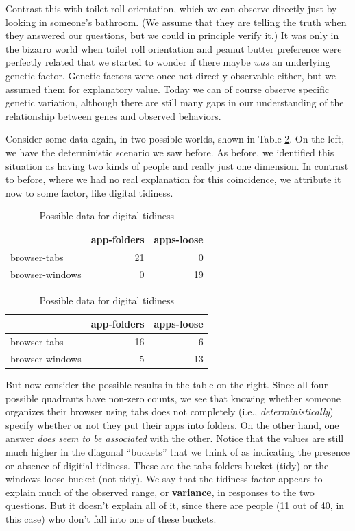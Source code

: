 \documentclass[openany]{book}
\begin{document}
Contrast this with toilet roll orientation, which we can observe directly just by looking in someone's bathroom. (We assume that they are telling the truth when they answered our questions, but we could in principle verify it.) It was only in the bizarro world when toilet roll orientation and peanut butter preference were perfectly related that we started to wonder if there maybe \emph{was} an underlying genetic factor. Genetic factors were once not directly observable either, but we assumed them for explanatory value. Today we can of course observe specific genetic variation, although there are still many gaps in our understanding of the relationship between genes and observed behaviors.

Consider some data again, in two possible worlds, shown in Table \ref{tab:tabsxapps}. On the left, we have the deterministic scenario we saw before. As before, we identified this situation as having two kinds of people and really just one dimension. In contrast to before, where we had no real explanation for this coincidence, we attribute it now to some factor, like digital tidiness.

\begin{table}[!h]
\caption{\label{tab:tabsxapps}Possible data for digital tidiness}

\centering
\begin{tabular}[t]{lrr}
\toprule
  & app-folders & apps-loose\\
\midrule
browser-tabs & 21 & 0\\
browser-windows & 0 & 19\\
\bottomrule
\end{tabular}
\centering
\begin{tabular}[t]{lrr}
\toprule
  & app-folders & apps-loose\\
\midrule
browser-tabs & 16 & 6\\
browser-windows & 5 & 13\\
\bottomrule
\end{tabular}
\end{table}

But now consider the possible results in the table on the right. Since all four possible quadrants have non-zero counts, we see that knowing whether someone organizes their browser using tabs does not completely (i.e., \emph{deterministically}) specify whether or not they put their apps into folders. On the other hand, one answer \emph{does seem to be associated} with the other. Notice that the values are still much higher in the diagonal ``buckets'' that we think of as indicating the presence or absence of digitial tidiness. These are the tabs-folders bucket (tidy) or the windows-loose bucket (not tidy). We say that the tidiness factor appears to explain much of the observed range, or \textbf{variance}, in responses to the two questions. But it doesn't explain all of it, since there are people (11 out of 40, in this case) who don't fall into one of these buckets.
\end{document}
